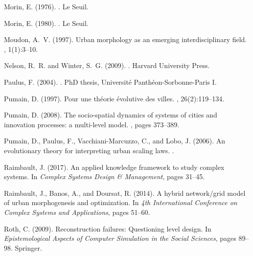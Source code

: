 \documentclass[letterpaper]{article}
\begin{document}
\begin{thebibliography}{}
Morin, E. (1976).
.
\newblock Le Seuil.

Morin, E. (1980).
.
\newblock Le Seuil.

Moudon, A.~V. (1997).
\newblock Urban morphology as an emerging interdisciplinary field.
, 1(1):3--10.

Nelson, R.~R. and Winter, S.~G. (2009).
.
\newblock Harvard University Press.

Paulus, F. (2004).
.
\newblock PhD thesis, Universit{\'e} Panth{\'e}on-Sorbonne-Paris I.

Pumain, D. (1997).
\newblock Pour une th{\'e}orie {\'e}volutive des villes.
, 26(2):119--134.

Pumain, D. (2008).
\newblock The socio-spatial dynamics of systems of cities and innovation
  processes: a multi-level model.
, pages 373--389.

Pumain, D., Paulus, F., Vacchiani-Marcuzzo, C., and Lobo, J. (2006).
\newblock An evolutionary theory for interpreting urban scaling laws.
.

Raimbault, J. (2017).
\newblock An applied knowledge framework to study complex systems.
\newblock In {\em Complex Systems Design \& Management}, pages 31--45.

Raimbault, J., Banos, A., and Doursat, R. (2014).
\newblock A hybrid network/grid model of urban morphogenesis and optimization.
\newblock In {\em 4th International Conference on Complex Systems and
  Applications}, pages 51--60.

Roth, C. (2009).
\newblock Reconstruction failures: Questioning level design.
\newblock In {\em Epistemological Aspects of Computer Simulation in the Social
  Sciences}, pages 89--98. Springer.


\end{thebibliography}
\end{document}

